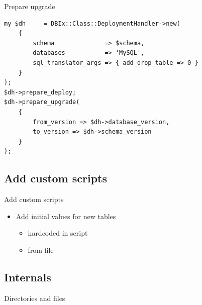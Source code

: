 \begin{frame}[fragile]{Prepare upgrade}
\begin{lstlisting}
my $dh     = DBIx::Class::DeploymentHandler->new(
    {
        schema              => $schema,
        databases           => 'MySQL',
        sql_translator_args => { add_drop_table => 0 }
    }
);
$dh->prepare_deploy;
$dh->prepare_upgrade(
    {
        from_version => $dh->database_version,
        to_version => $dh->schema_version
    }
);
\end{lstlisting}
\end{frame}

\subsection{Add custom scripts}

\begin{frame}{Add custom scripts}
\begin{itemize}
\item Add initial values for new tables
\begin{itemize}
\item hardcoded in script
\item from file
\end{itemize}
\end{itemize}
\end{frame}

\subsection{Internals}

\begin{frame}{Directories and files}
\end{frame}



